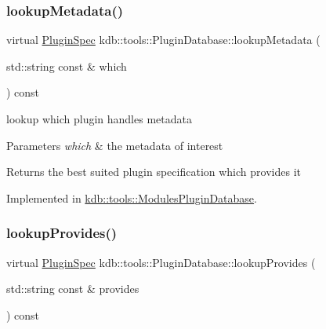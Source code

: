 \mbox{\label{classkdb_1_1tools_1_1PluginDatabase_a03a416f66d6525f46929e5a68d9db3f7}} 
\subsubsection{\texorpdfstring{lookupMetadata()}{lookupMetadata()}}
{\footnotesize\ttfamily virtual \mbox{\hyperlink{classkdb_1_1tools_1_1PluginSpec}{Plugin\+Spec}} kdb\+::tools\+::\+Plugin\+Database\+::lookup\+Metadata (\begin{DoxyParamCaption}\item[{std\+::string const \&}]{which }\end{DoxyParamCaption}) const\hspace{0.3cm}{\ttfamily [pure virtual]}}



lookup which plugin handles metadata 


\begin{DoxyParams}{Parameters}
{\em which} & the metadata of interest\\
\hline
\end{DoxyParams}
\begin{DoxyReturn}{Returns}
the best suited plugin specification which provides it 
\end{DoxyReturn}


Implemented in \mbox{\hyperlink{classkdb_1_1tools_1_1ModulesPluginDatabase_aa7f244f0271ea9b2a3f5b52779167f55}{kdb\+::tools\+::\+Modules\+Plugin\+Database}}.

\mbox{\label{classkdb_1_1tools_1_1PluginDatabase_a43abe56a024218ecee48526ced699f05}} 
\subsubsection{\texorpdfstring{lookupProvides()}{lookupProvides()}}
{\footnotesize\ttfamily virtual \mbox{\hyperlink{classkdb_1_1tools_1_1PluginSpec}{Plugin\+Spec}} kdb\+::tools\+::\+Plugin\+Database\+::lookup\+Provides (\begin{DoxyParamCaption}\item[{std\+::string const \&}]{provides }\end{DoxyParamCaption}) const\hspace{0.3cm}{\ttfamily [pure virtual]}}



